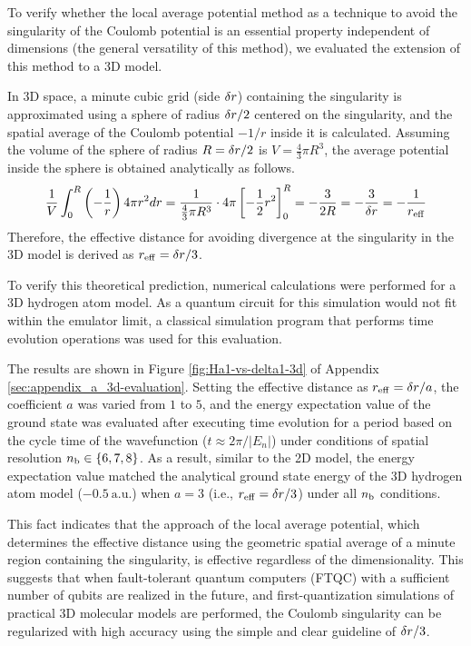 \documentclass[jctc-draft.tex]{subfiles}
\begin{document}
To verify whether the local average potential method as a technique to avoid the
singularity of the Coulomb potential is an essential property independent of
dimensions (the general versatility of this method), we evaluated the extension
of this method to a 3D model.

In 3D space, a minute cubic grid (side $\delta r$) containing the singularity is
approximated using a sphere of radius $\delta r/2$ centered on the singularity,
and the spatial average of the Coulomb potential $-1/r$ inside it is calculated.
Assuming the volume of the sphere of radius $R = \delta r/2$ is $V =
\frac{4}{3}\pi R^3$, the average potential inside the sphere is obtained
analytically as follows.
\begin{equation}
    \frac{1}{V} \int_{0}^{R} \left(-\frac{1}{r}\right) 4\pi r^2 dr 
    = \frac{1}{\frac{4}{3}\pi R^3} \cdot 4\pi
      \left[ -\frac{1}{2}r^2 \right]_{0}^{R} 
    = -\frac{3}{2R} = -\frac{3}{\delta r}=-\frac{1}{r_{\mathrm{eff}}}
\end{equation}
Therefore, the effective distance for avoiding divergence at the singularity in
the 3D model is derived as $r_{\mathrm{eff}} = \delta r/3$.

To verify this theoretical prediction, numerical calculations were performed for
a 3D hydrogen atom model. As a quantum circuit for this simulation would not
fit within the emulator limit, a classical simulation program that performs time
evolution operations was used for this evaluation.

The results are shown in Figure \ref{fig:Ha1-vs-delta1-3d} of Appendix
\ref{sec:appendix_a_3d-evaluation}. Setting the effective distance as
$r_{\mathrm{eff}} = \delta r/a$, the coefficient $a$ was varied from $1$ to $5$,
and the energy expectation value of the ground state was evaluated after
executing time evolution for a period based on the cycle time of the
wavefunction ($t\approx 2\pi/|E_n|$) under conditions of spatial resolution $n_{\mathrm{b}}
\in \{6, 7, 8\}$. As a result, similar to the 2D model, the energy expectation
value matched the analytical ground state energy of the 3D hydrogen atom model
($-0.5\ \mathrm{a.u.}$) when $a=3$ (i.e., $r_{\mathrm{eff}} = \delta r/3$) under
all $n_{\mathrm{b}}$ conditions.

This fact indicates that the approach of the local average potential, which
determines the effective distance using the geometric spatial average of a minute
region containing the singularity, is effective regardless of the
dimensionality. This suggests that when fault-tolerant quantum computers (FTQC)
with a sufficient number of qubits are realized in the future, and
first-quantization simulations of practical 3D molecular models are performed,
the Coulomb singularity can be regularized with high accuracy using the simple
and clear guideline of $\delta r/3$.
\end{document}
